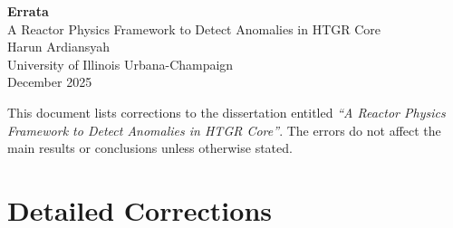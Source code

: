 \documentclass[12pt]{article}
\begin{document}
\begin{center}
    {\Large \textbf{Errata}}\\[1em]
    {\large A Reactor Physics Framework to Detect Anomalies in HTGR Core}\\[1em]
    Harun Ardiansyah\\
    University of Illinois Urbana-Champaign\\
    December 2025
\end{center}

\vspace{2em}

This document lists corrections to the dissertation entitled
\textit{``A Reactor Physics Framework to Detect Anomalies in HTGR Core''}. The errors do not affect the main results or conclusions unless otherwise stated.

\vspace{2em}

\section*{Detailed Corrections}
\end{document}
